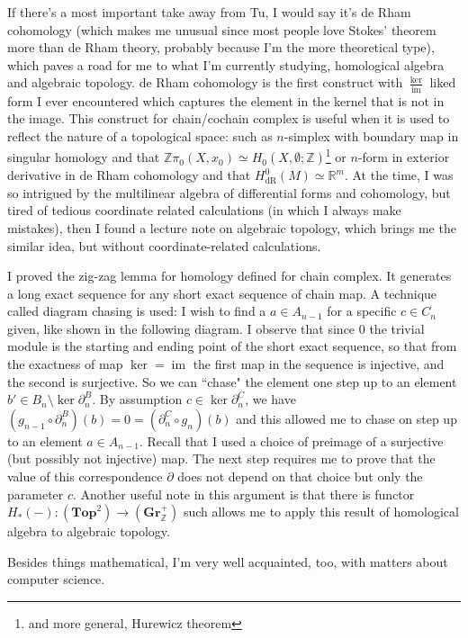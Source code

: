\documentclass[10pt]{article}
\begin{document}
\begin{CJK*}{UTF8}{gbsn}
If there's a most important take away from Tu, I would say it's de Rham cohomology (which makes me unusual since most people love Stokes' theorem more than de Rham theory, probably because I'm the more theoretical type), which paves a road for me to what I'm currently studying, homological algebra and algebraic topology. de Rham cohomology is the first construct with $\frac{\ker}{\operatorname{im}}$ liked form I ever encountered which captures the element in the kernel that is not in the image. This construct for chain/cochain complex is useful when it is used to reflect the nature of a topological space: such as $n$-simplex with boundary map in singular homology and that $\mathbb{Z}\pi_0(X,x_0)\simeq H_0(X,\emptyset;\mathbb{Z})$\footnote{and more general, Hurewicz theorem} or $n$-form in exterior derivative in de Rham cohomology and that $H^0_{\mathrm{dR}}(M)\simeq\mathbb{R}^m$. At the time, I was so intrigued by the multilinear algebra of differential forms and cohomology, but tired of tedious coordinate related calculations (in which I always make mistakes), then I found a lecture note on algebraic topology, which brings me the similar idea, but without coordinate-related calculations.

I proved the zig-zag lemma for homology defined for chain complex. It generates a long exact sequence for any short exact sequence of chain map. A technique called diagram chasing is used: I wish to find a $a\in A_{n-1}$ for a specific $c\in C_n$ given, like shown in the following diagram. I observe that since $0$ the trivial module is the starting and ending point of the short exact sequence, so that from the exactness of map $\ker=\operatorname{im}$ the first map in the sequence is injective, and the second is surjective. So we can ``chase" the element one step up to an element $b'\in B_n\setminus\ker\partial_n^B$. By assumption $c\in\ker\partial_n^C$, we have $(g_{n-1}\circ\partial_n^B)(b)=0=(\partial_n^C\circ g_n)(b)$ and this allowed me to chase on step up to an element $a\in A_{n-1}$. Recall that I used a choice of preimage of a surjective (but possibly not injective) map. The next step requires me to prove that the value of this correspondence $\partial$ does not depend on that choice but only the parameter $c$. Another useful note in this argument is that there is functor $H_*(-):(\mathbf{Top}^2)\to(\mathbf{Gr}_{\mathbb{Z}}^+)$ such allows me to apply this result of homological algebra to algebraic topology.

Besides things mathematical, I'm very well acquainted, too, with matters about computer science.


\end{CJK*}
\end{document}
